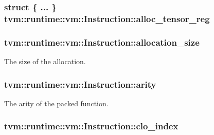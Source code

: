 \subsubsection[{\texorpdfstring{alloc\+\_\+tensor\+\_\+reg}{alloc_tensor_reg}}]{\setlength{\rightskip}{0pt plus 5cm}struct \{ ... \}   tvm\+::runtime\+::vm\+::\+Instruction\+::alloc\+\_\+tensor\+\_\+reg}\hypertarget{structtvm_1_1runtime_1_1vm_1_1Instruction_a631b30d31115b92d5b00e26769550b54}{}\label{structtvm_1_1runtime_1_1vm_1_1Instruction_a631b30d31115b92d5b00e26769550b54}
\subsubsection[{\texorpdfstring{allocation\+\_\+size}{allocation_size}}]{ tvm\+::runtime\+::vm\+::\+Instruction\+::allocation\+\_\+size}\hypertarget{structtvm_1_1runtime_1_1vm_1_1Instruction_a4f907889caa7c348a3a2dea88e89b827}{}\label{structtvm_1_1runtime_1_1vm_1_1Instruction_a4f907889caa7c348a3a2dea88e89b827}


The size of the allocation. 

\subsubsection[{\texorpdfstring{arity}{arity}}]{ tvm\+::runtime\+::vm\+::\+Instruction\+::arity}\hypertarget{structtvm_1_1runtime_1_1vm_1_1Instruction_a360b264ed892e620935b648e5a91a5ea}{}\label{structtvm_1_1runtime_1_1vm_1_1Instruction_a360b264ed892e620935b648e5a91a5ea}


The arity of the packed function. 

\subsubsection[{\texorpdfstring{clo\+\_\+index}{clo_index}}]{ tvm\+::runtime\+::vm\+::\+Instruction\+::clo\+\_\+index}\hypertarget{structtvm_1_1runtime_1_1vm_1_1Instruction_aaea1385d3562231a2e242faa0b51c616}{}\label{structtvm_1_1runtime_1_1vm_1_1Instruction_aaea1385d3562231a2e242faa0b51c616}


